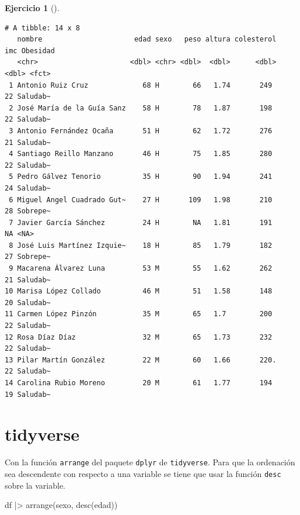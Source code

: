 \documentclass[
  a4paper,
]{scrreport}
\newenvironment{Shaded}{\begin{snugshade}}{\end{snugshade}}
\newcommand{\FunctionTok}[1]{\textcolor[rgb]{0.28,0.35,0.67}{#1}}
\newcommand{\NormalTok}[1]{\textcolor[rgb]{0.00,0.23,0.31}{#1}}
\newcommand{\SpecialCharTok}[1]{\textcolor[rgb]{0.37,0.37,0.37}{#1}}
\theoremstyle{definition}
\newtheorem{exercise}{Ejercicio}[chapter]
\theoremstyle{remark}
\begin{document}
\begin{exercise}[]
\begin{enumerate}
\begin{tcolorbox}
\begin{verbatim}
# A tibble: 14 x 8
   nombre                      edad sexo   peso altura colesterol   imc Obesidad
   <chr>                      <dbl> <chr> <dbl>  <dbl>      <dbl> <dbl> <fct>   
 1 Antonio Ruiz Cruz             68 H        66   1.74       249     22 Saludab~
 2 José María de la Guía Sanz    58 H        78   1.87       198     22 Saludab~
 3 Antonio Fernández Ocaña       51 H        62   1.72       276     21 Saludab~
 4 Santiago Reillo Manzano       46 H        75   1.85       280     22 Saludab~
 5 Pedro Gálvez Tenorio          35 H        90   1.94       241     24 Saludab~
 6 Miguel Angel Cuadrado Gut~    27 H       109   1.98       210     28 Sobrepe~
 7 Javier García Sánchez         24 H        NA   1.81       191     NA <NA>    
 8 José Luis Martínez Izquie~    18 H        85   1.79       182     27 Sobrepe~
 9 Macarena Álvarez Luna         53 M        55   1.62       262     21 Saludab~
10 Marisa López Collado          46 M        51   1.58       148     20 Saludab~
11 Carmen López Pinzón           35 M        65   1.7        200     22 Saludab~
12 Rosa Díaz Díaz                32 M        65   1.73       232     22 Saludab~
13 Pilar Martín González         22 M        60   1.66       220.    22 Saludab~
14 Carolina Rubio Moreno         20 M        61   1.77       194     19 Saludab~
\end{verbatim}

  \section{tidyverse}

  Con la función \texttt{arrange} del paquete \texttt{dplyr} de
  \texttt{tidyverse}. Para que la ordenación sea descendente con
  respecto a una variable se tiene que usar la función \texttt{desc}
  sobre la variable.

\begin{Shaded}
\begin{Highlighting}[]
\NormalTok{df }\SpecialCharTok{|\textgreater{}}
    \FunctionTok{arrange}\NormalTok{(sexo, }\FunctionTok{desc}\NormalTok{(edad))}
\end{Highlighting}
\end{Shaded}


\end{tcolorbox}
\end{enumerate}
\end{exercise}
\end{document}
